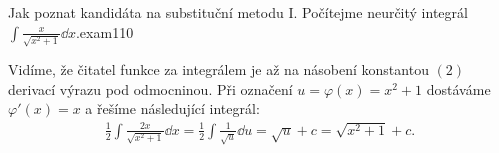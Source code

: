 \begin{mathexam}{Jak poznat kandidáta na substituční metodu I. Počítejme neurčitý integrál 
  \(\int\frac{x}{\sqrt{x^2+1}}\dd{x}\).}{exam110}

  Vidíme, že čitatel funkce za integrálem je až na násobení konstantou \((2)\) derivací výrazu pod
  odmocninou. Při označení \(u=\varphi(x) = x^2 + 1\) dostáváme \(\varphi'(x) = x\) a řešíme
  následující integrál:
  \begin{gather*}
    \frac{1}{2}\int\frac{2x}{\sqrt{x^2+1}}\dd{x} 
      = \frac{1}{2}\int\frac{1}{\sqrt{u}}\dd{u} = \sqrt{u} + c    
      = \sqrt{x^2 + 1} + c.  
  \end{gather*}
\end{mathexam}